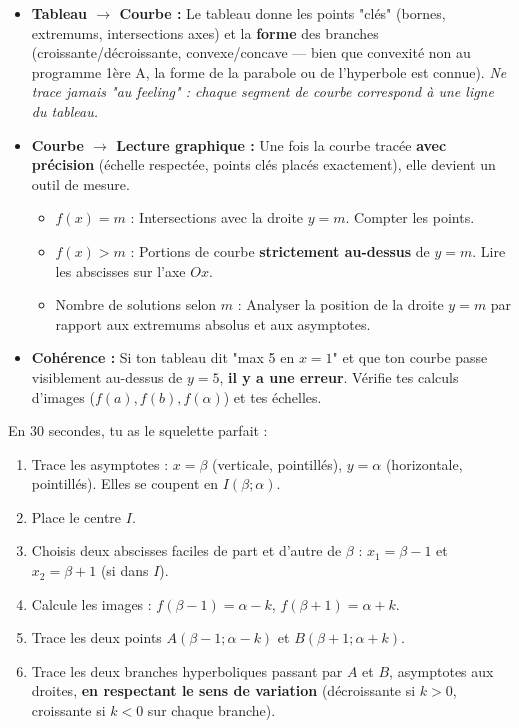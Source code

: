 \documentclass[11pt]{article}
\begin{document}
\begin{itemize}
    \item \textbf{Tableau $\to$ Courbe :} Le tableau donne les points "clés" (bornes, extremums, intersections axes) et la \textbf{forme} des branches (croissante/décroissante, convexe/concave — bien que convexité non au programme 1ère A, la forme de la parabole ou de l'hyperbole est connue). \emph{Ne trace jamais "au feeling" : chaque segment de courbe correspond à une ligne du tableau.}
    \item \textbf{Courbe $\to$ Lecture graphique :} Une fois la courbe tracée \textbf{avec précision} (échelle respectée, points clés placés exactement), elle devient un outil de mesure.
    \begin{itemize}
        \item $f(x) = m$ : Intersections avec la droite $y=m$. Compter les points.
        \item $f(x) > m$ : Portions de courbe \textbf{strictement au-dessus} de $y=m$. Lire les abscisses sur l'axe $Ox$.
        \item Nombre de solutions selon $m$ : Analyser la position de la droite $y=m$ par rapport aux extremums absolus et aux asymptotes.
    \end{itemize}
    \item \textbf{Cohérence :} Si ton tableau dit "max 5 en $x=1$" et que ton courbe passe visiblement au-dessus de $y=5$, \textbf{il y a une erreur}. Vérifie tes calculs d'images ($f(a), f(b), f(\alpha)$) et tes échelles.
\end{itemize}

\begin{methode}[Tracé rapide d'une homographique $f(x) = \alpha + \frac{k}{x-\beta}$]
En 30 secondes, tu as le squelette parfait :
\begin{enumerate}
    \item Trace les asymptotes : $x=\beta$ (verticale, pointillés), $y=\alpha$ (horizontale, pointillés). Elles se coupent en $I(\beta ; \alpha)$.
    \item Place le centre $I$.
    \item Choisis deux abscisses faciles de part et d'autre de $\beta$ : $x_1 = \beta - 1$ et $x_2 = \beta + 1$ (si dans $I$).
    \item Calcule les images : $f(\beta-1) = \alpha - k$, $f(\beta+1) = \alpha + k$.
    \item Trace les deux points $A(\beta-1 ; \alpha-k)$ et $B(\beta+1 ; \alpha+k)$.
    \item Trace les deux branches hyperboliques passant par $A$ et $B$, asymptotes aux droites, \textbf{en respectant le sens de variation} (décroissante si $k>0$, croissante si $k<0$ sur chaque branche).
\end{enumerate}
\end{methode}
\end{document}
